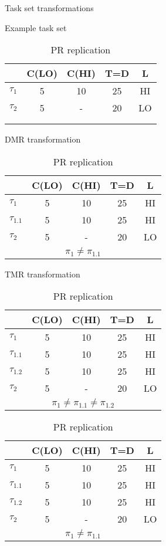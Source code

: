 	
\begin{table}
\centering
\caption{Task set transformations}
\label{t:transform}
	\begin{subtable}{0.3\textwidth}
		\caption{Example task set}
		\begin{tabular}{@{}l|cccc@{}}
		\toprule
		& C(LO) & C(HI) & T=D & L 	 \\\bottomrule
		$\tau_1$ & 5 & 10 & 25 & HI  \\
		$\tau_2$ & 5 & - & 20 & LO  \\
		\multicolumn{5}{c}{ } \\
		\multicolumn{5}{c}{ } \\
		\end{tabular}
	\end{subtable} \hspace{2cm}
	\begin{subtable}{0.3\textwidth}
		\caption{DMR transformation}
		\begin{tabular}{@{}l|cccc@{}}
		\toprule
				& C(LO) & C(HI) & T=D & L	 \\\bottomrule
		$\tau_1$ & 5 & 10 & 25 & HI  \\
		$\tau_{1.1}$ & 5 & 10 & 25 & HI  \\
		$\tau_2$ & 5 & - & 20 & LO  \\
		\multicolumn{5}{c}{$\pi_1 \ne \pi_{1.1}$}
		\end{tabular}
	\end{subtable}
	
	\begin{subtable}{0.3\textwidth}
		\caption{TMR transformation}
		\begin{tabular}{@{}l|cccc@{}}
		\toprule
				& C(LO) & C(HI) & T=D & L	 \\\bottomrule
		$\tau_1$ & 5 & 10 & 25 & HI  \\
		$\tau_{1.1}$ & 5 & 10 & 25 & HI  \\
		$\tau_{1.2}$ & 5 & 10 & 25 & HI  \\
		$\tau_2$ & 5 & - & 20 & LO  \\
		\multicolumn{5}{c}{$\pi_1 \ne \pi_{1.1} \ne \pi_{1.2}$}
		\end{tabular}
	\end{subtable} \hspace{2cm}
	\begin{subtable}{0.3\textwidth}
		\caption{PR replication}
		\begin{tabular}{@{}l|cccc@{}}
		\toprule
		& C(LO) & C(HI) & T=D & L	 \\\bottomrule
		$\tau_1$ & 5 & 10 & 25 & HI  \\
		$\tau_{1.1}$ & 5 & 10 & 25 & HI  \\
		$\tau_{1.2}$ & 5 & 10 & 25 & HI  \\
		$\tau_2$ & 5 & - & 20 & LO  \\
		\multicolumn{5}{c}{$\pi_1 \ne \pi_{1.1}$}
		\end{tabular}
	\end{subtable}
\end{table}


